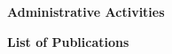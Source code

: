 \documentclass [a4paper,12pt]{article}
\begin{document}
\begin{flushleft}
\textbf{\textcolor[rgb]{0.00,0.00,1.00}{Administrative Activities}}
\end{flushleft}



 
% 


% 


%

\newpage
\begin{flushleft}
\textbf{\textcolor[rgb]{0.00,0.00,1.00}{List of Publications}}
\end{flushleft}




\end{document}
